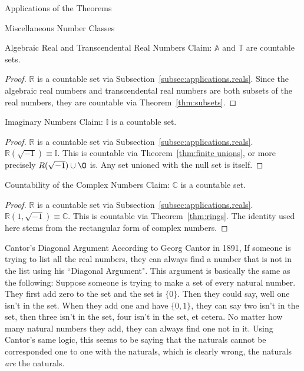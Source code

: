 \documentclass[12pt]{article}
\begin{document}
\begin{section}{Applications of the Theorems}
	\begin{subsection}{Miscellaneous Number Classes}\label{subsec:applications.miscellaneous}
		\begin{subsubsection}{Algebraic Real and Transcendental Real Numbers}
			\label{subsubsec:applications.misc.reals}
			Claim: $\mathbb A$ and $\mathbb T$ are countable sets.
			\begin{proof}
				$\mathbb R$ is a countable set via Subsection~\ref{subsec:applications.reals}.
				Since the algebraic real numbers and transcendental real numbers are both
				subsets of the real numbers, they are countable via Theorem~\ref{thm:subsets}.
			\end{proof}
		\end{subsubsection}

		\begin{subsubsection}{Imaginary Numbers}\label{subsubsec:applications.misc.imaginary}
			Claim: $\mathbb I$ is a countable set.
			\begin{proof}
				$\mathbb R$ is a countable set via Subsection~\ref{subsec:applications.reals}.
				$\mathbb R(\sqrt{-1})\equiv\mathbb I$. This is countable via Theorem~\ref{thm:finite unions},
				or more precisely $R(\sqrt{-1})\cup\O$ is. Any set unioned with the null set is itself.
			\end{proof}
		\end{subsubsection}
	\end{subsection}

	\begin{subsection}{Countability of the Complex Numbers}\label{subsec:applications.complex}
		Claim: $\mathbb C$ is a countable set.
		\begin{proof}
			$\mathbb R$ is a countable set via Subsection~\ref{subsec:applications.reals}.
			$\mathbb R(1, \sqrt{-1})\equiv\mathbb C$. This is countable via Theorem~\ref{thm:rings}.
			The identity used here stems from the rectangular form of complex numbers.
		\end{proof}
	\end{subsection}
\end{section}

\begin{section}{Cantor's Diagonal Argument}\label{sec:diagonal argument}
	According to Georg Cantor in 1891, If someone is trying to list all the real numbers,
	they can always find a number that is not in the list using his ``Diagonal Argument".
	This argument is basically the same as the following: Suppose someone is trying to make
	a set of every natural number. They first add zero to the set and the set is $\{0\}$.
	Then they could say, well one isn't in the set. When they add one and have $\{0,1\}$,
	they can say two isn't in the set, then three isn't in the set, four isn't in the set,
	et cetera. No matter how many natural numbers they add, they can always find one not in
	it. Using Cantor's same logic, this seems to be saying that the naturals cannot be
	corresponded one to one with the naturals, which is clearly wrong, the naturals
	\emph{are} the naturals.
\end{section}
\end{document}
